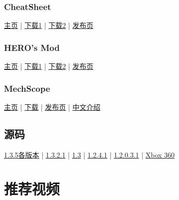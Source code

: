 \subsection{CheatSheet}\label{app5}
\href{https://github.com/JavidPack/CheatSheet}{主页} | \href{http://javid.ddns.net/tModLoader/download.php?Down=mods/CheatSheet.tmod}{下载1} | \href{https://github.com/JavidPack/CheatSheet/releases}{下载2} | \href{https://forums.terraria.org/index.php?threads/cheat-sheet.41407/}{发布页}

\subsection{HERO's Mod}\label{app6}
\href{https://github.com/JavidPack/HEROsMod}{主页} | \href{http://javid.ddns.net/tModLoader/download.php?Down=mods/HEROsMod.tmod}{下载1} | \href{https://github.com/JavidPack/HEROsMod/releases}{下载2} | \href{https://forums.terraria.org/index.php?threads/heros-mod-creative-mode-server-management-and-over-25-tools-1-3-4-4-compatible.44650/}{发布页}

\subsection{MechScope}\label{app7}
\href{https://github.com/DRKV333/MechScope}{主页} | \href{https://github.com/DRKV333/MechScope/releases/}{下载} | \href{https://forums.terraria.org/index.php?threads/mechscope-wiring-visualized.70665/}{发布页} | \href{https://www.bilibili.com/read/cv2222687}{中文介绍}

\section{源码}\label{app8}
\href{https://github.com/Pryaxis/Sources}{1.3.5各版本} | \href{https://github.com/NoviaDroid/TerrariaRefractoring_1.3.2.1}{1.3.2.1} | \href{https://github.com/saniainf/EDTerraria}{1.3} | \href{https://github.com/EdgeKiller/terrariaSource}{1.2.4.1} | \href{https://github.com/TheVamp/Terraria-Source-Code}{1.2.0.3.1} | \href{https://github.com/dptug/TerrariaXDK}{Xbox 360}

\chapter{推荐视频}
